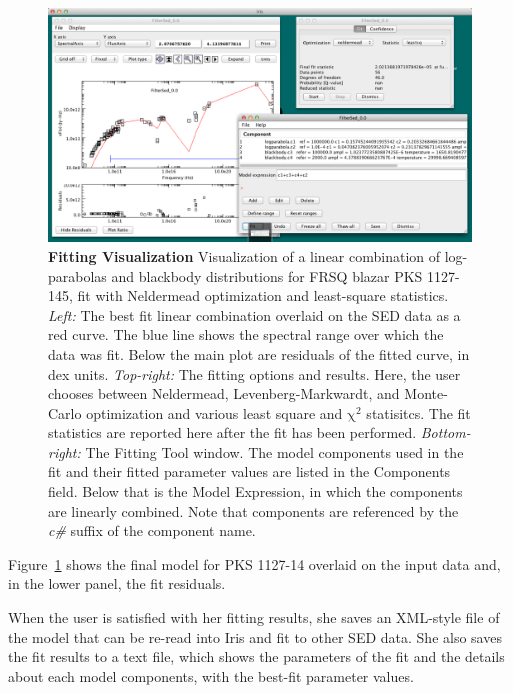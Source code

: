 \documentclass[5p]{elsarticle}
\begin{document}
\begin{figure}
\label{fig:fitting1}
\begin{center}
\includegraphics[height=0.3\textheight]{figures/fitting-1.png}
\caption{\textbf{Fitting Visualization} Visualization of a linear combination of log-parabolas and blackbody distributions for FRSQ blazar PKS 1127-145, fit with Neldermead optimization and least-square statistics. \textit{Left:} The best fit linear combination overlaid on the SED data as a red curve. The blue line shows the spectral range over which the data was fit. Below the main plot are residuals of the fitted curve, in dex units. \textit{Top-right:} The fitting options and results. Here, the user chooses between Neldermead, Levenberg-Markwardt, and Monte-Carlo optimization and various least square and $\mathrm{\chi}^{2}$ statisitcs. The fit statistics are reported here after the fit has been performed. \textit{Bottom-right:} The Fitting Tool window. The model components used in the fit and their fitted parameter values are listed in the Components field. Below that is the Model Expression, in which the components are linearly combined. Note that components are referenced by the \textit{c\#} suffix of the component name.}
\end{center}
\end{figure}

Figure~\ref{fig:fitting1} shows the final model for PKS 1127-14 overlaid on the input data and, in the lower panel, the fit residuals.

When the user is satisfied with her fitting results, she saves an XML-style file of the model that can be re-read into Iris and fit to other SED data. She also saves the fit results to a text file, which shows the parameters of the fit and the details about each model components, with the best-fit parameter values.
\end{document}
